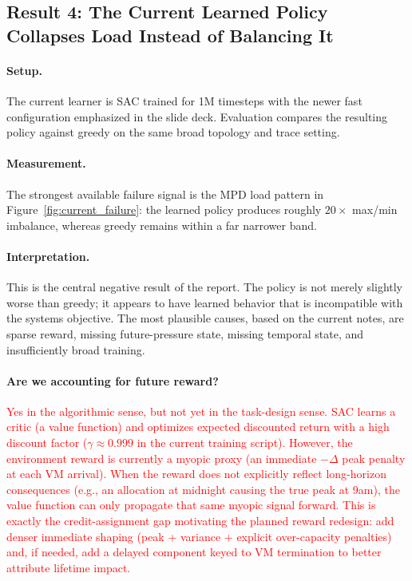 \documentclass[11pt]{article}
\theoremstyle{definition}
\begin{document}
\subsection{Result 4: The Current Learned Policy Collapses Load Instead of Balancing It}

\paragraph{Setup.}
The current learner is SAC trained for 1M timesteps with the newer fast
configuration emphasized in the slide deck. Evaluation compares the resulting
policy against greedy on the same broad topology and trace setting.

\paragraph{Measurement.}
The strongest available failure signal is the MPD load pattern in
Figure~\ref{fig:current_failure}: the learned policy produces roughly
$20\times$ max/min imbalance, whereas greedy remains within a far narrower band.

\paragraph{Interpretation.}
This is the central negative result of the report. The policy is not merely
slightly worse than greedy; it appears to have learned behavior that is
incompatible with the systems objective. The most plausible causes, based on the
current notes, are sparse reward, missing future-pressure state, missing temporal
state, and insufficiently broad training.

\paragraph{Are we accounting for future reward?}
\textcolor{red}{Yes in the algorithmic sense, but not yet in the task-design sense. SAC learns a
critic (a value function) and optimizes expected discounted return with a high
discount factor ($\gamma \approx 0.999$ in the current training script). However,
the environment reward is currently a myopic proxy (an immediate $-\Delta$ peak
penalty at each VM arrival). When the reward does not explicitly reflect
long-horizon consequences (e.g., an allocation at midnight causing the true peak
at 9am), the value function can only propagate that same myopic signal forward.
This is exactly the credit-assignment gap motivating the planned reward redesign:
add denser immediate shaping (peak + variance + explicit over-capacity penalties)
and, if needed, add a delayed component keyed to VM termination to better
attribute lifetime impact.}
\end{document}
